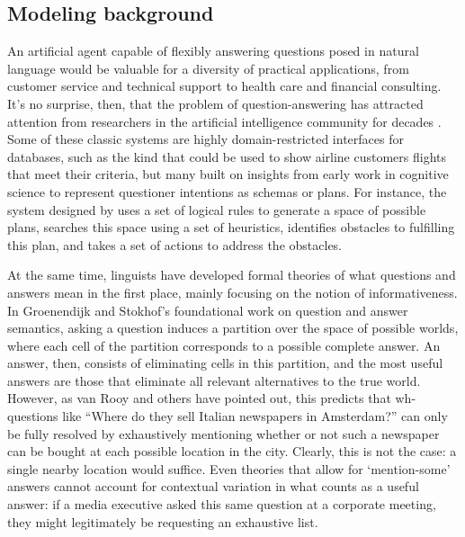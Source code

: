 \documentclass[12pt, floatsintext, jou]{apa6}
\begin{document}
\subsection{Modeling background}

An artificial agent capable of flexibly answering questions posed in natural language would be valuable for a diversity of practical applications, from customer service and technical support to health care and financial consulting. It's no surprise, then, that the problem of question-answering has attracted attention from researchers in the artificial intelligence community for decades \cite{Simmons65_QuestionsComputer, Lehnert77_QuestionAnswering, AllenPerrault80_IntentionUtterances, GreenCarberry94_IndirectAnswersModel, MollaVicedo07_QARestrictedDomains}. Some of these classic systems are highly domain-restricted interfaces for databases, such as the kind that could be used to show airline customers flights that meet their criteria, but many built on insights from early work in cognitive science to represent questioner intentions as schemas or plans. For instance, the system designed by  uses a set of logical rules to generate a space of possible plans, searches this space using a set of heuristics, identifies obstacles to fulfilling this plan, and takes a set of actions to address the obstacles. 

At the same time, linguists have developed formal theories of what questions and answers mean in the first place, mainly focusing on the notion of informativeness. In Groenendijk and Stokhof's \citeyear{GroenendijkStokhof84_SemanticsOfQuestions} foundational work on question and answer semantics, asking a question induces a partition over the space of possible worlds, where each cell of the partition corresponds to a possible complete answer. An answer, then, consists of eliminating cells in this partition, and the most useful answers are those that eliminate all relevant alternatives to the true world. However, as van Rooy \citeyear{VanRooy03_QuestioningDecisionProblems} and others \cite{Ginzburg95_ResolvingQuestions} have pointed out, this predicts that wh-questions like ``Where do they sell Italian newspapers in Amsterdam?'' can only be fully resolved by exhaustively mentioning whether or not such a newspaper can be bought at each possible location in the city. Clearly, this is not the case: a single nearby location would suffice. Even theories that allow for `mention-some' answers cannot account for contextual variation in what counts as a useful answer: if a media executive asked this same question at a corporate meeting, they might legitimately be requesting an exhaustive list.
\end{document}
